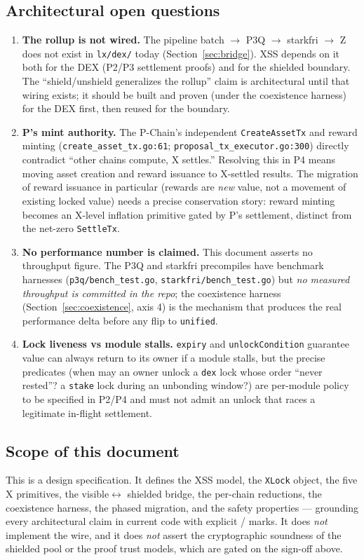 \subsection{Architectural open questions}

\begin{enumerate}[leftmargin=2em]
\item \textbf{The rollup is not wired.} The pipeline batch $\to$ P3Q
  $\to$ starkfri $\to$ Z does not exist in \texttt{lx/dex/} today
  (Section~\ref{sec:bridge}). XSS depends on it both for the DEX (P2/P3
  settlement proofs) and for the shielded boundary. The
  ``shield/unshield generalizes the rollup'' claim is architectural
  until that wiring exists; it should be built and proven (under the
  coexistence harness) for the DEX first, then reused for the boundary.
\item \textbf{P's mint authority.} The P-Chain's independent
  \texttt{CreateAssetTx} and reward minting
  (\texttt{create\_asset\_tx.go:61};
  \texttt{proposal\_tx\_executor.go:300}) directly contradict ``other
  chains compute, X settles.'' Resolving this in P4 means moving asset
  creation and reward issuance to X-settled results. The migration of
  reward issuance in particular (rewards are \emph{new} value, not a
  movement of existing locked value) needs a precise conservation story:
  reward minting becomes an X-level inflation primitive gated by P's
  settlement, distinct from the net-zero \texttt{SettleTx}.
\item \textbf{No performance number is claimed.} This document asserts
  no throughput figure. The P3Q and starkfri precompiles have benchmark
  harnesses (\texttt{p3q/bench\_test.go}, \texttt{starkfri/bench\_test.go})
  but \emph{no measured throughput is committed in the repo}; the
  coexistence harness (Section~\ref{sec:coexistence}, axis 4) is the
  mechanism that produces the real performance delta before any flip to
  \texttt{unified}.
\item \textbf{Lock liveness vs module stalls.} \texttt{expiry} and
  \texttt{unlockCondition} guarantee value can always return to its
  owner if a module stalls, but the precise predicates (when may an
  owner unlock a \texttt{dex} lock whose order ``never rested''? a
  \texttt{stake} lock during an unbonding window?) are per-module policy
  to be specified in P2/P4 and must not admit an unlock that races a
  legitimate in-flight settlement.
\end{enumerate}

\subsection{Scope of this document}

This is a design specification. It defines the XSS model, the
\texttt{XLock} object, the five X primitives, the visible$\leftrightarrow$
shielded bridge, the per-chain reductions, the coexistence harness, the
phased migration, and the safety properties --- grounding every
architectural claim in current code with explicit \IMPL{} /
\DESIGN{} marks. It does \emph{not} implement the wire, and it does
\emph{not} assert the cryptographic soundness of the shielded pool or
the proof trust models, which are gated on the sign-off above.
